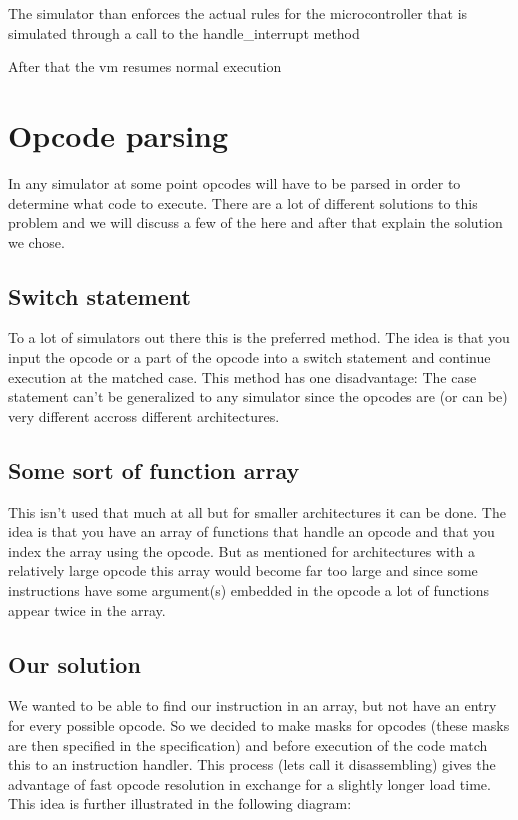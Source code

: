 \documentclass[a4paper]{report}
\begin{document}
The simulator than enforces the actual rules for the microcontroller
that is simulated through a call to the handle\_interrupt method

After that the vm resumes normal execution
\section[Opcode parsing]{Opcode parsing}
In any simulator at some point opcodes will have to be parsed in order
to determine what code to execute. There are a lot of different
solutions to this problem and we will discuss a few of the here and
after that explain the solution we chose.

\subsection[Switch statement]{Switch statement}
To a lot of simulators out there this is the preferred method. The idea
is that you input the opcode or a part of the opcode into a switch
statement and continue execution at the matched case. This method has
one disadvantage: The case statement can't be generalized to any
simulator since the opcodes are (or can be) very different accross
different architectures.

\subsection{Some sort of function array}
This isn't used that much at all but for smaller architectures it can be
done. The idea is that you have an array of functions that handle an
opcode and that you index the array using the opcode. But as mentioned
for architectures with a relatively large opcode this array would
become far too large and since some instructions have some argument(s)
embedded in the opcode a lot of functions appear twice in the array.

\subsection{Our solution}
We wanted to be able to find our instruction in an array, but not have
an entry for every possible opcode. So we decided to make masks for
opcodes (these masks are then specified in the specification) and
before execution of the code match this to an instruction handler. This
process (lets call it disassembling) gives the advantage of fast opcode
resolution in exchange for a slightly longer load time. This idea is
further illustrated in the following diagram:
\end{document}
